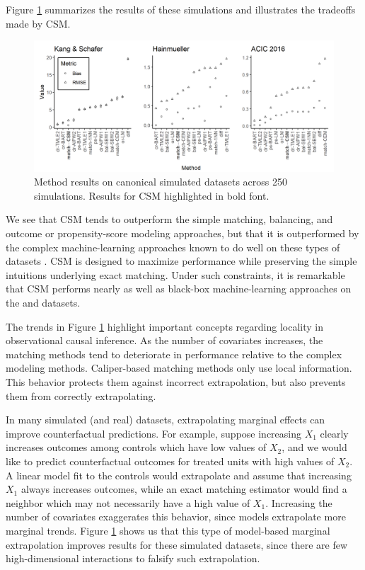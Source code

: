 \documentclass{article}
\begin{document}
Figure \ref{fig:sim_results} summarizes the results of these simulations and illustrates the tradeoffs made by CSM.
\begin{figure}
    \centering
    \includegraphics[width=\textwidth]{writeup/figures/sim_results.png}
    \caption{Method results on canonical simulated datasets across 250 simulations. 
        Results for CSM highlighted in bold font.}
    \label{fig:sim_results}
\end{figure}
We see that CSM tends to outperform the simple matching, balancing, and outcome or propensity-score modeling approaches, but that it is outperformed by the complex machine-learning approaches known to do well on these types of datasets \citep{dorie2019automated}.
CSM is designed to maximize performance while preserving the simple intuitions underlying exact matching.
Under such constraints, it is remarkable that CSM performs nearly as well as black-box machine-learning approaches on the \citet{kang2007demystifying} and \citet{hainmueller2012entropy} datasets.

The trends in Figure \ref{fig:sim_results} highlight important concepts regarding locality in observational causal inference.
As the number of covariates increases, the matching methods tend to deteriorate in performance relative to the complex modeling methods.
Caliper-based matching methods only use local information.
This behavior protects them against incorrect extrapolation, but also prevents them from correctly extrapolating.

In many simulated (and real) datasets, extrapolating marginal effects can improve counterfactual predictions.
For example, suppose increasing $X_1$ clearly increases outcomes among controls which have low values of $X_2$, and we would like to predict counterfactual outcomes for treated units with high values of $X_2$.
A linear model fit to the controls would extrapolate and assume that increasing $X_1$ always increases outcomes, while an exact matching estimator would find a neighbor which may not necessarily have a high value of $X_1$.
Increasing the number of covariates exaggerates this behavior, since models extrapolate more marginal trends.
Figure \ref{fig:sim_results} shows us that this type of model-based marginal extrapolation improves results for these simulated datasets, since there are few high-dimensional interactions to falsify such extrapolation.
\end{document}
